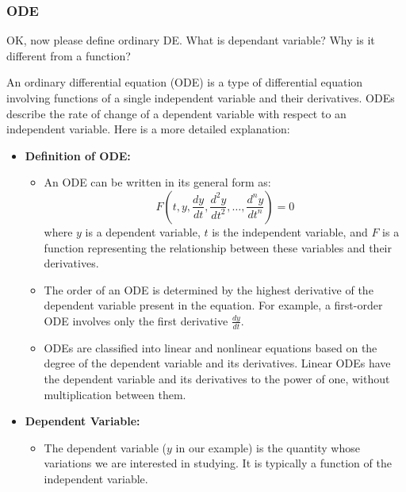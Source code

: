 \subsubsection{ODE}

\begin{ai}
OK, now please define ordinary DE. What is dependant variable? Why is it different from a function?
\end{ai}

\begin{airesult}
An ordinary differential equation (ODE) is a type of differential equation involving functions of a
single independent variable and their derivatives. ODEs describe the rate of change of a dependent
variable with respect to an independent variable. Here is a more detailed explanation:

\vsp

\begin{itemize}
\item \textbf{Definition of ODE:}

  \begin{itemize}
  \item An ODE can be written in its general form as:
  \[
  F\left(t, y, \frac{dy}{dt}, \frac{d^2y}{dt^2}, \ldots, \frac{d^n y}{dt^n}\right) = 0
  \]
  where \(y\) is a dependent variable, \(t\) is the independent variable, and \(F\) is a function
representing the relationship between these variables and their derivatives.

  \item The order of an ODE is determined by the highest derivative of the dependent variable
present in the equation. For example, a first-order ODE involves only the first derivative
\(\frac{dy}{dt}\).

  \item ODEs are classified into linear and nonlinear equations based on the degree of the dependent
variable and its derivatives. Linear ODEs have the dependent variable and its derivatives to the
power of one, without multiplication between them.

  \end{itemize}

\item \textbf{Dependent Variable:}

  \begin{itemize}
  \item The dependent variable (\(y\) in our example) is the quantity whose variations we are
interested in studying. It is typically a function of the independent variable.


\end{itemize}
\end{itemize}
\end{airesult}
